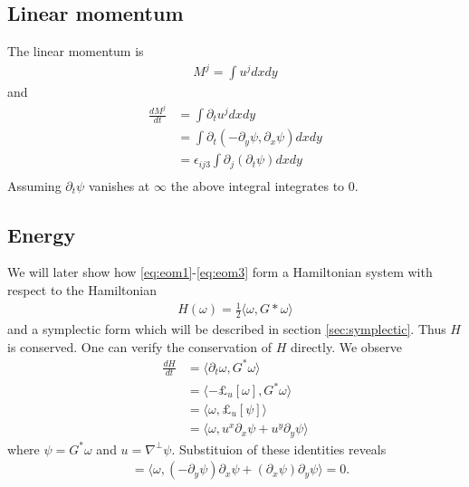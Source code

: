 \documentclass[12pt]{amsart}
\begin{document}
\subsection{Linear momentum}
\label{sec:linear}
The linear momentum is
\begin{align*}
  M^j = \int u^j dx dy
\end{align*}
and
\begin{align*}
  \frac{dM^j}{dt} &= \int \partial_t u^j dxdy \\
  &= \int  \partial_t (-\partial_y \psi , \partial_x \psi) dxdy \\
  &= \epsilon_{ij3} \int \partial_j( \partial_t \psi) dx dy \\
\end{align*}
Assuming $\partial_t \psi$ vanishes at $\infty$ the above integral integrates to $0$.

\subsection{Energy}
\label{sec:energy}
We will later show how \eqref{eq:eom1}-\eqref{eq:eom3} form a Hamiltonian system with respect to the Hamiltonian
\begin{align*}
  H(\omega) = \frac{1}{2} \langle \omega , G* \omega\rangle
\end{align*}
and a symplectic form which will be described in section \ref{sec:symplectic}.
Thus $H$ is conserved.
One can verify the conservation of $H$ directly.  We observe
\begin{align*}
  \frac{dH}{dt} &= \langle \partial_t \omega, G^* \omega \rangle \\
  &= \langle - \pounds_u [\omega] , G^* \omega \rangle \\
  &= \langle \omega , \pounds_u [\psi] \rangle \\
  &= \langle \omega , u^x \partial_x \psi + u^y \partial_y \psi \rangle
\end{align*}
where $\psi = G^*\omega$ and $u = \nabla^\perp \psi$.
Substituion of these identities reveals
\begin{align*}
  &= \langle \omega , (-\partial_y \psi) \partial_x \psi + (\partial_x \psi)  \partial_y \psi \rangle = 0.
\end{align*}
\end{document}

